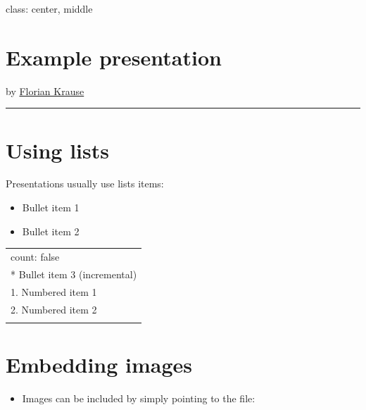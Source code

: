 \documentclass[]{article}
\author{}
\date{}
\begin{document}
{
\hypersetup{linkcolor=black}
\setcounter{tocdepth}{3}
\tableofcontents
}
class: center, middle

\section{Example presentation}\label{example-presentation}

by \href{http://www.fladd.de}{Florian Krause}

\begin{center}\rule{3in}{0.4pt}\end{center}

\section{Using lists}\label{using-lists}

Presentations usually use lists items:

\begin{itemize}
\item
  Bullet item 1
\item
  Bullet item 2
\end{itemize}

\begin{longtable}[c]{@{}l@{}}
\toprule\addlinespace
\begin{minipage}[t]{0.03\columnwidth}\raggedright
count: false
\end{minipage}
\\\addlinespace
\begin{minipage}[t]{0.03\columnwidth}\raggedright
* Bullet item 3 (incremental)
\end{minipage}
\\\addlinespace
\begin{minipage}[t]{0.03\columnwidth}\raggedright
1. Numbered item 1
\end{minipage}
\\\addlinespace
\begin{minipage}[t]{0.03\columnwidth}\raggedright
2. Numbered item 2
\end{minipage}
\\\addlinespace
\bottomrule
\end{longtable}

\section{Embedding images}\label{embedding-images}

\begin{itemize}
\itemsep1pt\parskip0pt
\item
  Images can be included by simply pointing to the file:
\end{itemize}
\end{document}
